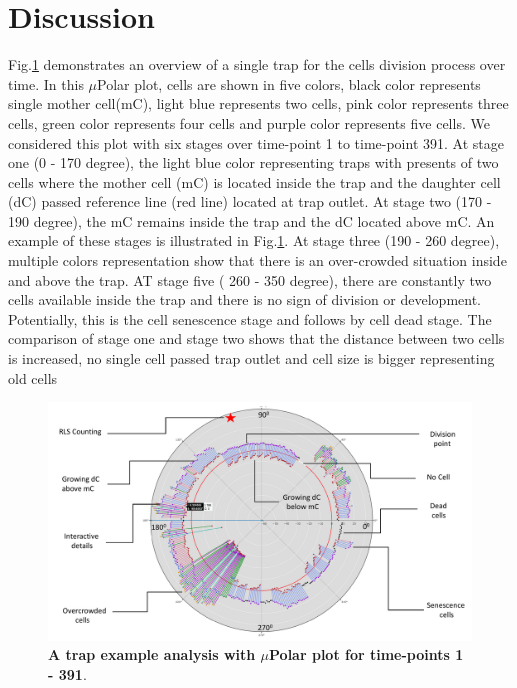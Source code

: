 \documentclass[conference]{IEEEtran}
\begin{document}
\section{Discussion}



Fig.\ref{fig:explain} demonstrates an overview of a single trap for the cells division process over time. In this $\mu$Polar plot, cells are shown in five colors, black color represents single mother cell(mC), light blue represents two cells, pink color represents three cells, green color represents four cells and purple color represents five cells. We considered this plot with six stages over time-point 1 to time-point 391. At stage one (0 - 170 degree), the light blue color representing traps with presents of two cells where the mother cell (mC) is located inside the trap and the daughter cell (dC) passed reference line (red line) located at trap outlet. At stage two (170 - 190 degree), the mC remains inside the trap and the dC located above mC.  An example of these stages is illustrated in Fig.\ref{fig:explain}. At stage three (190 - 260 degree), multiple colors representation show that there is an over-crowded situation inside and above the trap. AT stage five ( 260 - 350 degree), there are constantly two cells available inside the trap and there is no sign of division or development. Potentially, this is the cell senescence stage and follows by cell dead stage. The comparison of stage one and stage two shows that the distance between two cells is increased, no single cell passed trap outlet and cell size is bigger representing old cells    


\begin{figure}
\centering
\includegraphics[width=\textwidth,height=10 cm]{Patterns/explain.pdf}
\caption{ \textbf{A trap example analysis with $\mu$Polar plot for time-points 1 - 391}.}
\label{fig:explain}
\end{figure}
\end{document}
